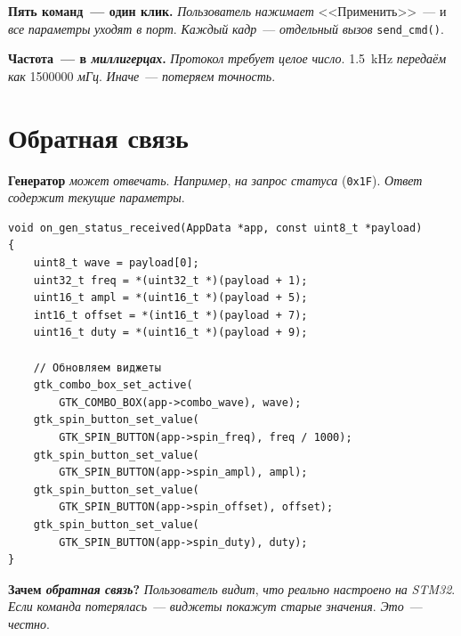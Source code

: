 \begin{keybox}
\textbf{Пять команд~--- один клик.} \emph{Пользователь}
\emph{нажимает} <<Применить>>~--- и \emph{все} \emph{параметры}
\emph{уходят} \emph{в} \emph{порт}. \emph{Каждый} \emph{кадр}~---
\emph{отдельный} \emph{вызов} \texttt{send\_cmd()}.
\end{keybox}

\begin{warnbox}
\textbf{Частота~--- в \emph{миллигерцах}.} \emph{Протокол}
\emph{требует} \emph{целое} \emph{число}. \SI{1.5}{\kilo\hertz}
\emph{передаём} \emph{как} \num{1500000} \emph{мГц}.
\emph{Иначе}~--- \emph{потеряем} \emph{точность}.
\end{warnbox}

\section{Обратная связь}
\label{sec:gen-ui-feedback}

\textbf{Генератор} \emph{может} \emph{отвечать}. \emph{Например},
\emph{на} \emph{запрос} \emph{статуса} (\texttt{0x1F}). \emph{Ответ}
\emph{содержит} \emph{текущие} \emph{параметры}.

\begin{listing}[htbp]
\begin{verbatim}
void on_gen_status_received(AppData *app, const uint8_t *payload)
{
    uint8_t wave = payload[0];
    uint32_t freq = *(uint32_t *)(payload + 1);
    uint16_t ampl = *(uint16_t *)(payload + 5);
    int16_t offset = *(int16_t *)(payload + 7);
    uint16_t duty = *(uint16_t *)(payload + 9);

    // Обновляем виджеты
    gtk_combo_box_set_active(
        GTK_COMBO_BOX(app->combo_wave), wave);
    gtk_spin_button_set_value(
        GTK_SPIN_BUTTON(app->spin_freq), freq / 1000);
    gtk_spin_button_set_value(
        GTK_SPIN_BUTTON(app->spin_ampl), ampl);
    gtk_spin_button_set_value(
        GTK_SPIN_BUTTON(app->spin_offset), offset);
    gtk_spin_button_set_value(
        GTK_SPIN_BUTTON(app->spin_duty), duty);
}
\end{verbatim}
\caption{\texttt{on\_gen\_status\_received()}: обновление виджетов}
\label{lst:gen-ui-status}
\end{listing}

\begin{ideabox}
\textbf{Зачем \emph{обратная} \emph{связь}?} \emph{Пользователь}
\emph{видит}, \emph{что} \emph{реально} \emph{настроено} \emph{на}
\emph{STM32}. \emph{Если} \emph{команда} \emph{потерялась}~---
\emph{виджеты} \emph{покажут} \emph{старые} \emph{значения}.
\emph{Это}~--- \emph{честно}.
\end{ideabox}

